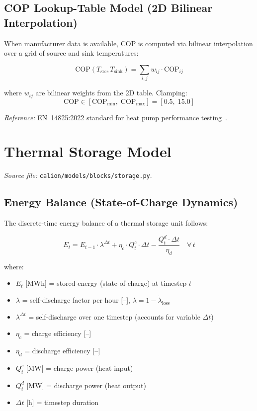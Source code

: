 \documentclass[a4paper,12pt]{article}
\newcommand{\COP}{\mathrm{COP}}
\begin{document}
\subsection{COP Lookup-Table Model (2D Bilinear Interpolation)}

When manufacturer data is available, COP is computed via bilinear interpolation over a
grid of source and sink temperatures:

\begin{equation}
  \COP(T_{\text{src}}, T_{\text{sink}})
  = \sum_{i,j} w_{ij} \cdot \COP_{ij}
  \label{eq:cop-lookup}
\end{equation}

where $w_{ij}$ are bilinear weights from the 2D table. Clamping:
\[
  \COP \in [\COP_{\min},\; \COP_{\max}] = [0.5,\; 15.0]
\]

\noindent\textit{Reference:} EN~14825:2022 standard for heat pump performance
testing~\cite{EN14825}.

\section{Thermal Storage Model}
\label{sec:storage}

\textit{Source file:} \texttt{calion/models/blocks/storage.py}.

\subsection{Energy Balance (State-of-Charge Dynamics)}

The discrete-time energy balance of a thermal storage unit follows:

\begin{equation}
  E_{t}
  = E_{t-1} \cdot \lambda^{\Delta t}
    + \eta_{c} \cdot Q^{c}_{t} \cdot \Delta t
    - \frac{Q^{d}_{t} \cdot \Delta t}{\eta_{d}}
  \quad \forall\, t
  \tag{ST-1}
  \label{eq:storage-soc}
\end{equation}

\noindent where:
\begin{itemize}
  \item $E_{t}$ [MWh] = stored energy (state-of-charge) at timestep $t$
  \item $\lambda$ = self-discharge factor per hour [--], $\lambda = 1 - \dot{\lambda}_{\text{loss}}$
  \item $\lambda^{\Delta t}$ = self-discharge over one timestep (accounts for variable $\Delta t$)
  \item $\eta_{c}$ = charge efficiency [--]
  \item $\eta_{d}$ = discharge efficiency [--]
  \item $Q^{c}_{t}$ [MW] = charge power (heat input)
  \item $Q^{d}_{t}$ [MW] = discharge power (heat output)
  \item $\Delta t$ [h] = timestep duration
\end{itemize}
\end{document}
